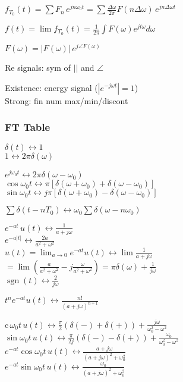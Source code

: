 \documentclass[4pt]{article}
\theoremstyle{definition}
\theoremstyle{definition}
\renewcommand{\c}{\mathrm{c}\,}
\renewcommand{\o}{\omega}
\newcommand{\lra}{\leftrightarrow}
\DeclareMathOperator{\sgn}{sgn}
\begin{document}
\begin{multicols}{3}
    \(f_{T_0}(t) = \sum F_n\, e^{jn\omega_0 t} = \sum \frac {\Delta\omega} {2\pi} F(n\Delta\omega)\,  e^{jn\Delta\omega t}\)

    \(f(t) = \lim f_{T_0} (t) = \frac{1}{2\pi}\int F(\omega) e^{jt\omega} d\omega\)

    \(F(\omega) = |F(\omega)| \, e^{j\angle F(\omega)}\)

    Re signals: sym of $||$ and $\angle$

    Existence: energy signal ($|e^{-j\o t}| = 1$)\\
    Strong: fin num max/min/discont

\subsubsection{FT Table}

    \(\delta(t) \leftrightarrow 1\)\\
    $1 \leftrightarrow 2\pi\delta(\omega)$

    \(e^{j\o_0 t}\lra 2\pi\delta(\o - \o_0)\)\\         %
    \(\cos \o_0 t\lra \pi[\delta(\o+\o_0) + \delta(\o - \o_0)]\)\\
    \(\sin \o_0 t\lra j\pi[\delta(\o + \o_0) - \delta(\o - \o_0)]\)

    \(\sum \delta(t-nT_0) \lra \o_0\sum \delta(\o - n\o_0)\)        %

    $e^{-at} \, u(t) \leftrightarrow \frac{1}{a+j\omega}$\\         %
    $e^{-a|t|} \leftrightarrow \frac{2a}{a^2+\omega^2}$ \\
    \(u(t) = \lim_{a\rightarrow 0} e^{-at} u(t)\lra \lim \frac{1}{a+j\o}\)
    \( = \lim(\frac{a}{a^2+\o^2} - j\frac{\o}{a^2+\o^2 }) = \pi\delta(\o) + \frac{1}{j\o}\) \\      %
    \(\sgn(t)\lra \frac{2}{j\o}\)

    \(t^n e^{-at} u(t)\lra \frac{n!}{(a+j\o)^{n+1}}\)

    \(\c \o_0 t\, u(t)\lra \frac{\pi}{2}(\delta(-) + \delta(+)) + \frac{j\o}{\o_0^2-\o^2}\)\\       %
    \(\sin \o_0 t\, u(t)\lra \frac{\pi}{2j}(\delta(-) - \delta(+)) + \frac{\o_0}{\o_0^2-\o^2}\)\\
    \(e^{-at}\cos \o_0t\, u(t)\lra \frac{a+j\o}{(a+j\o)^2 + \o_0^2}\)\\
    \(e^{-at}\sin \o_0t\, u(t)\lra \frac{\o_0}{(a+j\o)^2 + \o_0^2}\)           



\end{multicols}
\end{document}
